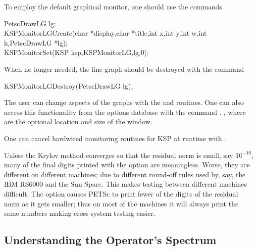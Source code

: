 To employ the default graphical monitor, one should use the 
commands  
\begin{tabbing}
   PetscDrawLG lg;\\
  KSPMonitorLGCreate(char *display,char *title,int x,int y,int w,int h,PetscDrawLG *lg);\\
  KSPMonitorSet(KSP ksp,KSPMonitorLG,lg,0);
\end{tabbing}
When no longer needed, the line graph should be destroyed 
with the command
\begin{tabbing}
  KSPMonitorLGDestroy(PetscDrawLG lg);
\end{tabbing}
The user can change aspects of the graphs with the  and 
 routines.  
One can also access this functionality from the options database 
with the command  \trl{[x,y,w,h]}. , 
where  are the optional location and size of the window.

One can cancel hardwired monitoring routines for KSP at runtime with 
. 

Unless the Krylov method converges so that the residual norm is small,
say $ 10^{-10} $, many of the final digits printed with the 
option are meaningless. Worse, they are different on different 
machines; due to different round-off rules used by, say, the IBM RS6000
and the Sun Sparc. This makes testing between different machines
difficult. The option  
causes PETSc to print fewer of the digits of the residual norm 
as it gets smaller; thus on most of the machines it will always
print the same numbers making cross system testing easier.


\subsection{Understanding the Operator's Spectrum}

